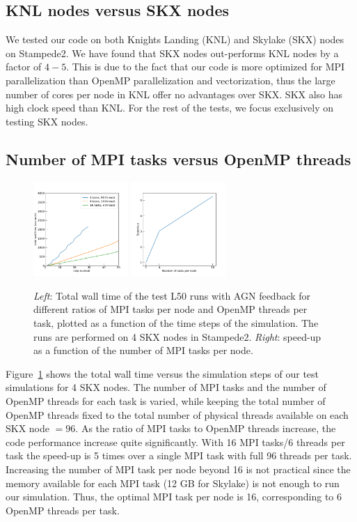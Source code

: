 \documentclass[letterpaper,11pt]{article}
\begin{document}
\subsection{KNL nodes versus SKX nodes}

We tested our code on both Knights Landing (KNL) and Skylake (SKX) nodes on Stampede2. We have found that SKX nodes out-performs KNL nodes by a factor of $4-5$. This is due to the fact that our code is more optimized for MPI parallelization than OpenMP parallelization and vectorization, thus the large number of cores per node in KNL offer no advantages over SKX. SKX also has high clock speed than KNL. For the rest of the tests, we focus exclusively on testing SKX nodes. 

\subsection{Number of MPI tasks versus OpenMP threads}

\begin{figure}[htbp]
\centering
\includegraphics[width=0.32\textwidth]{cum_time_step_N4.pdf}
\includegraphics[width=0.32\textwidth]{task2thread_N4.pdf}
\caption{{\em Left}: Total wall time of the test L50 runs with AGN feedback for different ratios of MPI tasks per node and OpenMP threads per task, plotted as a function of the time steps of the simulation. The runs are performed on 4 SKX nodes in Stampede2. {\em Right}: speed-up as a function of the number of MPI tasks per node.   
}  
\label{fig:mpi_omp}
\end{figure}

Figure~\ref{fig:mpi_omp} shows the total wall time versus the simulation steps of our test simulations for 4 SKX nodes. The number of MPI tasks and the number of OpenMP threads for each task is varied, while keeping the total number of OpenMP threads fixed to the total number of physical threads available on each SKX node $= 96$. As the ratio of MPI tasks to OpenMP threads increase, the code performance increase quite significantly. With 16 MPI tasks/6 threads per task the speed-up is 5 times over a single MPI task with full 96 threads per task. Increasing the number of MPI task per node beyond 16 is not practical since the memory available for each MPI task (12 GB for Skylake) is not enough to run our simulation. Thus, the optimal MPI task per node is 16, corresponding to 6 OpenMP threads per task. 
\end{document}
